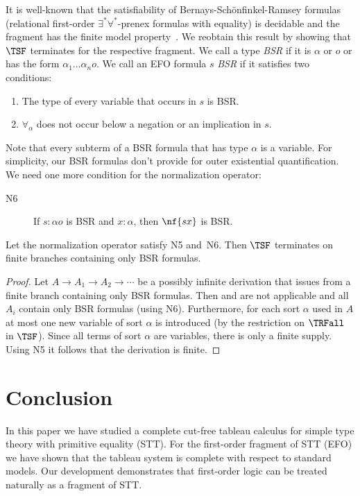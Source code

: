 It is well-known that the satisfiability of Bernays-Sch\"onfinkel-Ramsey
formulas (relational first-order $\exists^*\forall^*$-prenex
formulas with equality) is decidable and the fragment has the
finite model property~\cite{BGG97}.  We reobtain this
result by showing that $\TSF$ terminates for the
respective fragment.  We call a type \emph{BSR} if it
is $\alpha$ or $o$ or has the form $\alpha_1\dots\alpha_n o$.
We call an EFO formula $s$ \emph{BSR} if it satisfies
two conditions:
\begin{enumerate}
\item The type of every variable that occurs in $s$ is
  BSR.
\item $\forall_{\!\alpha}$ does not occur below a negation or an implication in
  $s$.
\end{enumerate}
Note that every subterm of a BSR formula that has type $\alpha$
is a variable.
For simplicity, our BSR formulas don't provide for
outer existential quantification.  We need one more
condition for the normalization operator:
\begin{description}
\item[{N6}] If $s:\alpha o$ is BSR and $x:\alpha$,
  then $\nf{sx}$ is BSR.
\end{description}

\begin{prop}
  Let the normalization operator satisfy N5 and~N6.
  Then $\TSF$ terminates on finite branches containing
  only BSR formulas.
\end{prop}

\begin{proof}
  Let $A\to A_1\to A_2\to\cdots$ be a possibly infinite
  derivation that issues from a finite branch
  containing only BSR formulas.  Then \TRFalln and
  \TRFFE are not applicable and all $A_i$ contain only
  BSR formulas (using N6).  Furthermore, for each sort $\alpha$
  used in $A$ at most one new
  variable of sort $\alpha$ is introduced (by the restriction on $\TRFall$ in $\TSF$).
  Since all terms of sort $\alpha$ are variables, there is only a finite supply.
  Using N5 it follows that the derivation is finite.
\end{proof}

\section{Conclusion}

In this paper we have studied a complete cut-free tableau calculus
for simple type theory with primitive equality (STT).  For the first-order
fragment of STT (EFO) we have shown that the tableau system is complete with respect
to standard models.  Our development demonstrates
that first-order logic can be treated naturally as a fragment of STT.

